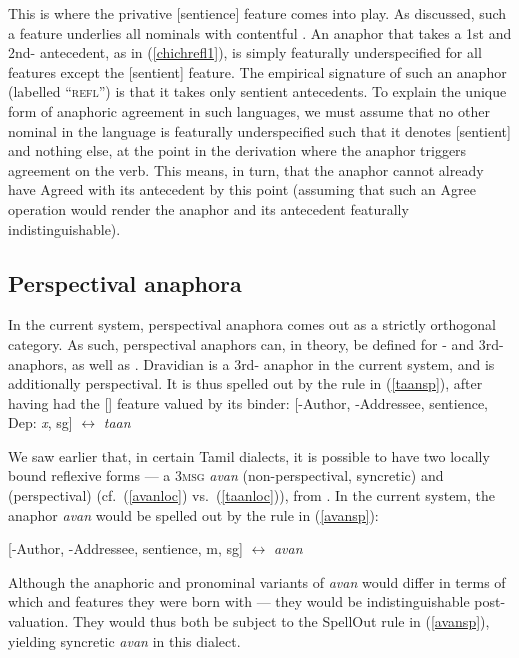 \documentclass[output=paper, modfonts, nonflat]{langsci/langscibook}
\begin{document}
This is where the privative [sentience] feature comes into play. As
discussed, such a feature underlies all nominals with contentful
\person. An anaphor that takes a 1st and 2nd-\person{} antecedent, as
in (\ref{chichrefl1}), is simply featurally underspecified for all
features except the [sentient] feature. The empirical signature of
such an anaphor (labelled ``\textsc{refl}'') is that it takes only
sentient antecedents. To explain the unique form of anaphoric
agreement in such languages, we must assume that no other nominal in
the language is featurally underspecified such that it denotes
[sentient] and nothing else, at the point in the derivation where the
anaphor triggers agreement on the verb. This means, in turn, that the
anaphor cannot already have Agreed with its antecedent by this point
(assuming that such an Agree operation would render the anaphor and
its antecedent featurally indistinguishable).



        \subsection{Perspectival anaphora}

        
        In the current system, perspectival anaphora comes out as a
        strictly orthogonal category. As such, perspectival anaphors
        can, in theory, be defined for \nul-\person{} and
        3rd-\person{} anaphors, as well as . Dravidian \taan{} is
        a 3rd-\person{} anaphor in the current system, and is
        additionally perspectival. It is thus spelled out by the rule
        in (\ref{taansp}), after having had the [\dep] feature valued
        by its binder: \ea\label{taansp} {[}-Author, -Addressee, sentience,
        Dep: \textit{x}, sg] $\leftrightarrow$ \textit{taan} \z

        \noindent We saw earlier that, in certain Tamil dialects, it is possible
        to have two locally bound reflexive forms --- a \textsc{3msg}
        \textit{avan} (non-perspectival, syncretic) and \taan{}
        (perspectival) (cf.\ (\ref{avanloc}) vs.\ (\ref{taanloc})),
        from \citet{sundaresan:2012}. In the current system, the
        anaphor \textit{avan} would be spelled out by the rule in
        (\ref{avansp}):

        \ea\label{avansp} {[}-Author, -Addressee, sentience, m, sg]
        $\leftrightarrow$ \textit{avan} \z

        \noindent Although the anaphoric and pronominal variants of
        \textit{avan} would differ in terms of which \num{} and
        \gender{} features they were born with --- they would be
        indistinguishable post-valuation. They would thus both be
        subject to the SpellOut rule in (\ref{avansp}), yielding
        syncretic \textit{avan} in this dialect.
\end{document}
